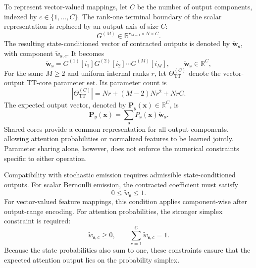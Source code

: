 \documentclass[pdflatex,sn-mathphys-num]{sn-jnl}
\theoremstyle{thmstyleone}
\theoremstyle{thmstyletwo}
\theoremstyle{thmstylethree}
\begin{document}
To represent vector-valued mappings, let $C$ be the number of output components, indexed by $c\in\{1,\ldots,C\}$. The rank-one terminal boundary of the scalar representation is replaced by an output axis of size $C$:
\begin{equation}
G^{(M)} \in \mathbb{R}^{r_{M-1}\times N\times C}.
\end{equation}
The resulting state-conditioned vector of contracted outputs is denoted by $\widetilde{\boldsymbol{w}}_{\boldsymbol{s}}$, with component $\widetilde{w}_{\boldsymbol{s},c}$. It becomes
\begin{equation}
\widetilde{\boldsymbol{w}}_{\boldsymbol{s}} = G^{(1)}[i_1] G^{(2)}[i_2] \cdots G^{(M)}[i_M], \qquad \widetilde{\boldsymbol{w}}_{\boldsymbol{s}} \in \mathbb{R}^{C}, \label{eq:frost_tt_vector}
\end{equation}
For the same $M\geq2$ and uniform internal ranks $r$, let $\Theta_{\mathrm{TT}}^{(C)}$ denote the vector-output TT-core parameter set. Its parameter count is
\begin{equation}
\left|\Theta_{\mathrm{TT}}^{(C)}\right| = Nr+(M-2)Nr^2+NrC. \label{eq:tt_vector_parameters}
\end{equation}
The expected output vector, denoted by $\boldsymbol{P}_y(\boldsymbol{x})\in\mathbb{R}^{C}$, is
\begin{equation}
\boldsymbol{P}_y(\boldsymbol{x}) = \sum_{\boldsymbol{s}} P_{\boldsymbol{s}}(\boldsymbol{x}) \widetilde{\boldsymbol{w}}_{\boldsymbol{s}}. \label{eq:frost_vector_output}
\end{equation}
Shared cores provide a common representation for all output components, allowing attention probabilities or normalized features to be learned jointly. Parameter sharing alone, however, does not enforce the numerical constraints specific to either operation.

Compatibility with stochastic emission requires admissible state-conditioned outputs. For scalar Bernoulli emission, the contracted coefficient must satisfy
\begin{equation}
0 \leq \widetilde{w}_{\boldsymbol{s}} \leq 1.
\end{equation}
For vector-valued feature mappings, this condition applies component-wise after output-range encoding. For attention probabilities, the stronger simplex constraint is required:
\begin{equation}
\widetilde{w}_{\boldsymbol{s},c} \geq0, \qquad \sum_{c=1}^{C} \widetilde{w}_{\boldsymbol{s},c} = 1. \label{eq:simplex_constraint}
\end{equation}
Because the state probabilities also sum to one, these constraints ensure that the expected attention output lies on the probability simplex.
\end{document}
